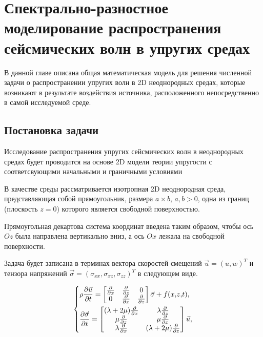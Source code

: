 \section{Спектрально-разностное моделирование распространения сейсмических волн в упругих средах}

В данной главе описана общая математическая модель для решения численной задачи о распространении
упругих волн в 2D неоднородных средах, которые возникают в результате воздействия источника,
расположенного непосредственно в самой исследуемой среде.

\subsection{Постановка задачи}
Исследование распространения упругих сейсмических волн в неоднородных средах будет проводится на 
основе 2D модели теории упругости с соответсвующими начальными и граничными условиями \cite{novac, filon, shem}

В качестве среды рассматривается изотропная 2D неоднородная среда, представляющая собой прямоугольник, размера $a \times b$, $a, b>0$,
одна из границ (плоскость $z = 0$) которого является свободной поверхностью.

Прямоугольная декартова система координат введена таким образом, чтобы ось $Oz$ была направлена вертикально вниз,
а ось $Ox$ лежала на свободной поверхности.


Задача будет записана в терминах вектора скоростей смещений $\vec{u}={(u, w)}^T$
и тензора напряжений $\vec{\sigma}=(\sigma_{xx}, \sigma_{xz}, \sigma_{zz})^T$ в следующем виде.

\begin{equation}
\label{eq:1}
\begin{dcases}
	\rho\frac{\partial{\vec{u}}}{\partial{t}}
	=\begin{bmatrix}
    \frac{\partial{}}{\partial{x}} & \frac{\partial{}}{\partial{z}} & 0 \\
    0 & \frac{\partial{}}{\partial{x}} & \frac{\partial{}}{\partial{z}}
	\end{bmatrix}
	\vec{\sigma} + f(x{,} z{,} t), \\
	\frac{\partial{\vec{\sigma}}}{\partial{t}}
	=\begin{bmatrix}
    (\lambda+2\mu)\frac{\partial{}}{\partial{x}} & \lambda\frac{\partial{}}{\partial{z}} \\
    \mu\frac{\partial{}}{\partial{z}} & \mu\frac{\partial{}}{\partial{x}} \\
    \lambda\frac{\partial{}}{\partial{x}} & (\lambda+2\mu)\frac{\partial{}}{\partial{z}}
	\end{bmatrix}
	\vec{u},
\end{dcases}
\end{equation}

